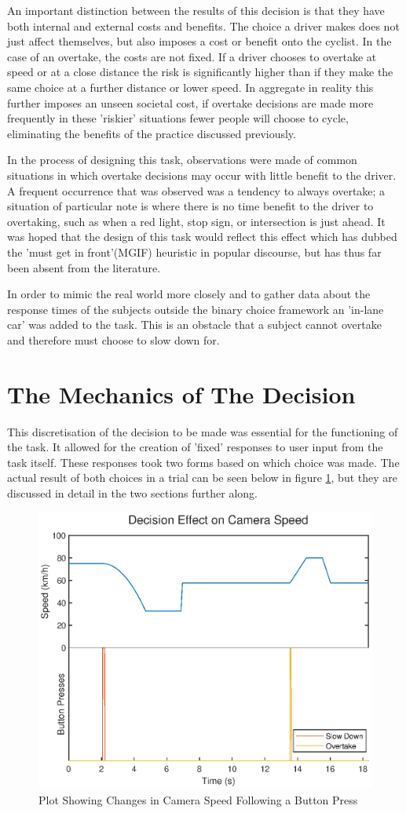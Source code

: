 An important distinction between the results of this decision is that they have both internal and external costs and benefits. The choice a driver makes does not just affect themselves, but also imposes a cost or benefit onto the cyclist. In the case of an overtake, the costs are not fixed. If a driver chooses to overtake at speed or at a close distance the risk is significantly higher than if they make the same choice at a further distance or lower speed. In aggregate in reality this further imposes an unseen societal cost, if overtake decisions are made more frequently in these 'riskier' situations fewer people will choose to cycle, eliminating the benefits of the practice discussed previously.

In the process of designing this task, observations were made of common situations in which overtake decisions may occur with little benefit to the driver. A frequent occurrence that was observed was a tendency to always overtake; a situation of particular note is where there is no time benefit to the driver to overtaking, such as when a red light, stop sign, or intersection is just ahead. It was hoped that the design of this task would reflect this effect which has dubbed the 'must get in front'(MGIF) heuristic in popular discourse, but has thus far been absent from the literature.

In order to mimic the real world more closely and to gather data about the response times of the subjects outside the binary choice framework an 'in-lane car' was added to the task. This is an obstacle that a subject cannot overtake and therefore must choose to slow down for.

\section{The Mechanics of The Decision}
This discretisation of the decision to be made was essential for the functioning of the task. It allowed for the creation of 'fixed' responses to user input from the task itself. These responses took two forms based on which choice was made. The actual result of both choices in a trial can be seen below in figure \ref{fig:MET_Speed_Changes}, but they are discussed in detail in the two sections further along.
\begin{figure}[H]
    \centering
    \includegraphics[width=0.6\linewidth]{figures/Method_Speed_Changes.eps}
    \caption{Plot Showing Changes in Camera Speed Following a Button Press}
    \label{fig:MET_Speed_Changes}
\end{figure}

